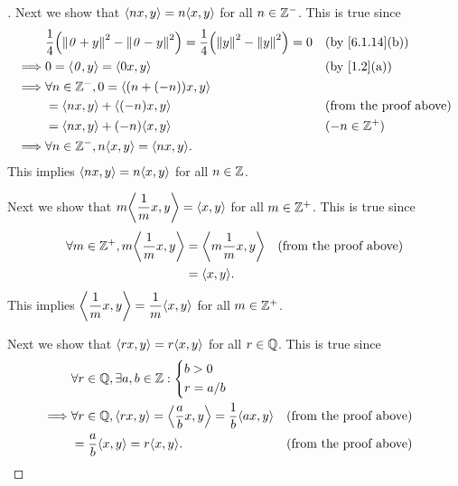 \begin{proof}[]
  Next we show that \(\inn{nx, y} = n \inn{x, y}\) for all \(n \in \mathbb{Z}^-\).
  This is true since
  \begin{align*}
             & \dfrac{1}{4} \pa{\norm{\zv + y}^2 - \norm{\zv - y}^2} = \dfrac{1}{4} \pa{\norm{y}^2 - \norm{y}^2} = 0 &  & \by{6.1.14}[b]                \\
    \implies & 0 = \inn{\zv, y} = \inn{0x, y}                                                                        &  & \by{1.2}[a]                   \\
    \implies & \forall n \in \Z^-, 0 = \inn{(n + (-n)) x, y}                                                                                            \\
             & = \inn{nx, y} + \inn{(-n)x, y}                                                                        &  & \text{(from the proof above)} \\
             & = \inn{nx, y} + (-n) \inn{x, y}                                                                       &  & (-n \in \Z^+)                 \\
    \implies & \forall n \in \Z^-, n \inn{x, y} = \inn{nx, y}.
  \end{align*}
  This implies \(\inn{nx, y} = n \inn{x, y}\) for all \(n \in \mathbb{Z}\).

  Next we show that \(m \inn{\dfrac{1}{m} x, y} = \inn{x, y}\) for all \(m \in \mathbb{Z}^+\).
  This is true since
  \begin{align*}
    \forall m \in \Z^+, m \inn{\dfrac{1}{m} x, y} & = \inn{m \dfrac{1}{m} x, y} &  & \text{(from the proof above)} \\
                                                  & = \inn{x, y}.
  \end{align*}
  This implies \(\inn{\dfrac{1}{m} x, y} = \dfrac{1}{m} \inn{x, y}\) for all \(m \in \mathbb{Z}^+\).

  Next we show that \(\inn{rx, y} = r \inn{x, y}\) for all \(r \in \mathbb{Q}\).
  This is true since
  \begin{align*}
             & \forall r \in \Q, \exists a, b \in \Z : \begin{dcases}
                                                         b > 0 \\
                                                         r = a / b
                                                       \end{dcases}                                                                 \\
    \implies & \forall r \in \Q, \inn{rx, y} = \inn{\dfrac{a}{b} x, y} = \dfrac{1}{b} \inn{ax, y} &  & \text{(from the proof above)} \\
             & = \dfrac{a}{b} \inn{x, y} = r \inn{x, y}.                                          &  & \text{(from the proof above)}
  \end{align*}


\end{proof}
